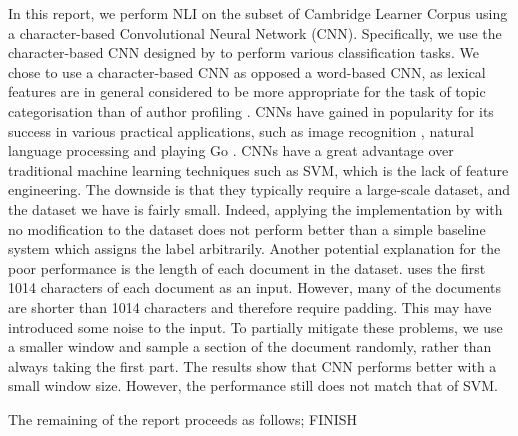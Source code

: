 In this report, we perform NLI on the subset of Cambridge Learner Corpus  \citep{nicholls2003cambridge, yannakoudakis2011new} using a character-based Convolutional Neural Network (CNN).
Specifically, we use the character-based CNN designed by \cite{zhang2015character} to perform various classification tasks.
We chose to use a character-based CNN as opposed a word-based CNN, as lexical features are in general considered to be more appropriate for the task of topic categorisation than of author profiling  \citep{kochmar2011identification}.
CNNs have gained in popularity for its success in various practical applications, such as image recognition \citep{krizhevsky2012imagenet, simonyan2014very, he2016deep}, natural language processing \citep{jackson2007natural, collobert2011natural, kalchbrenner2014convolutional} and playing Go \citep{silver2016mastering}.
CNNs have a great advantage over traditional machine learning techniques such as SVM, which is the lack of feature engineering.
The downside is that they typically require a large-scale dataset, and the dataset we have is fairly small.
Indeed, applying the implementation by  \cite{zhang2015character} with no modification to the dataset does not perform better than a simple baseline system which assigns the label arbitrarily.
Another potential explanation for the poor performance is the length of each document in the dataset.
\cite{zhang2015character} uses the first 1014 characters of each document as an input.
However, many of the documents are shorter than 1014 characters and therefore require padding.
This may have introduced some noise to the input.
To partially mitigate these problems, we use a smaller window and sample a section of the document randomly, rather than always taking the first part.
The results show that CNN performs better with a small window size.
However, the performance still does not match that of SVM.

The remaining of the report proceeds as follows; \color{red} FINISH \color{black}